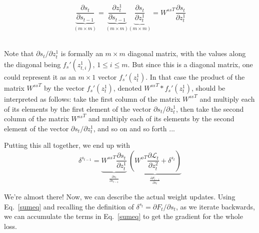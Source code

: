 \begin{enumerate}[(1)]
\begin{equation}
  \underbrace{\frac{\partial s_t}{\partial s_{t - 1}}}_{(m \times m)}
= \underbrace{\frac{\partial z_t^1}{\partial s_{t - 1}}}_{(m \times
  m)} \underbrace{\frac{\partial s_t}{\partial z_t^1}}_{(m
  \times m)} = {W^{ss}}^T \frac{\partial s_t}{\partial z_t^1}
\end{equation} \\
\begin{examplebox} Note that $\partial s_t /\partial z^1_t$
is formally an $m \times m$ diagonal matrix, with the values
  along the diagonal being $f_{s}'(z_{t,i}^1)$, $1 \leq i \leq m$. But since this is a diagonal matrix, one could represent it as an $m \times 1$ vector $f_{s}'(z_t^1)$. In that case the product of the matrix ${W^{ss}}^T$ by the vector $f_{s}'(z_t^1)$, denoted ${W^{ss}}^T * f_{s}'(z_t^1)$, should be interpreted as follows: take the first column of the matrix ${W^{ss}}^T$ and multiply each of its elements by the first element of the vector $\partial s_t /\partial z^1_t$, then take the second column of the matrix ${W^{ss}}^T$ and multiply each of its elements by the second element of the vector $\partial s_t /\partial z^1_t$, and so on and so forth ...
\end{examplebox}
  
Putting this all together, we end up with
\begin{equation}
  \delta^{s_{t - 1}} = \underbrace{{W^{ss}}^T \frac{\partial s_t}{\partial z_t^1}}_{\frac{\partial s_t}{\partial s_{t - 1}}} ~ \underbrace{\left({W^o}^T\frac{\partial{\mathcal{L}_t}}{\partial z_t^2} + \delta^{s_t}\right)}_{\frac{\partial F_{t - 1}}{\partial s_t}} 
\end{equation}

We're almost there!  Now, we can describe the actual weight updates.
Using Eq.~\ref{sumeq} and recalling the definition of
$\delta^{s_t} = \partial F_t / \partial s_t$, 
as we iterate backwards, we can accumulate the terms in Eq.~\ref{sumeq}
to get the gradient for the whole  loss.

\end{enumerate}
